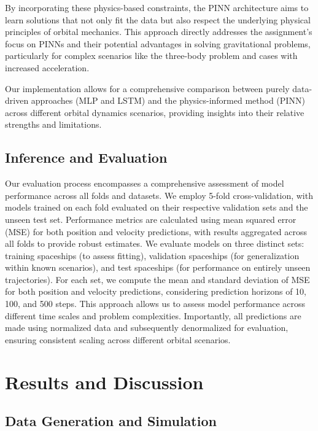 \documentclass[12pt,a4paper]{article}
\begin{document}
By incorporating these physics-based constraints, the PINN architecture aims to learn solutions that not only fit the data but also respect the underlying physical principles of orbital mechanics. This approach directly addresses the assignment's focus on PINNs and their potential advantages in solving gravitational problems, particularly for complex scenarios like the three-body problem and cases with increased acceleration.

Our implementation allows for a comprehensive comparison between purely data-driven approaches (MLP and LSTM) and the physics-informed method (PINN) across different orbital dynamics scenarios, providing insights into their relative strengths and limitations.

\subsection{Inference and Evaluation}

Our evaluation process encompasses a comprehensive assessment of model performance across all folds and datasets. We employ 5-fold cross-validation, with models trained on each fold evaluated on their respective validation sets and the unseen test set. Performance metrics are calculated using mean squared error (MSE) for both position and velocity predictions, with results aggregated across all folds to provide robust estimates. We evaluate models on three distinct sets: training spaceships (to assess fitting), validation spaceships (for generalization within known scenarios), and test spaceships (for performance on entirely unseen trajectories). For each set, we compute the mean and standard deviation of MSE for both position and velocity predictions, considering prediction horizons of 10, 100, and 500 steps. This approach allows us to assess model performance across different time scales and problem complexities. Importantly, all predictions are made using normalized data and subsequently denormalized for evaluation, ensuring consistent scaling across different orbital scenarios.

\section{Results and Discussion}
\label{sec:results}

\subsection{Data Generation and Simulation}
\end{document}
